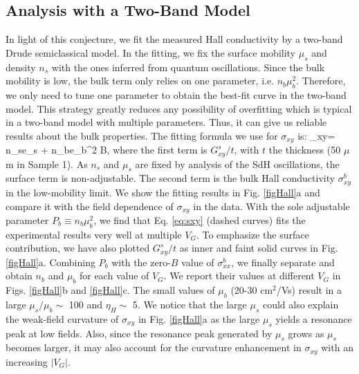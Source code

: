 \subsection{Analysis with a Two-Band Model}

In light of this conjecture, we fit the measured Hall conductivity by a two-band Drude semiclassical model. In the fitting, we fix the surface mobility $\mu_s$ and density $n_s$ with the ones inferred from quantum oscillations. Since the bulk mobility is low, the bulk term only relies on one parameter, i.e.  $n_b\mu_b^2$. Therefore, we only need to tune one parameter to obtain the best-fit curve in the two-band model. This strategy greatly reduces any possibility of overfitting which is typical in a two-band model with multiple parameters. Thus, it can give us reliable results about the bulk properties. The fitting formula we use for $\sigma_{xy}$ is:
\be
\sigma_{xy}= n_se\mu_s + n_be\mu_b^2 B,
\label{eq:sxy}
\ee
where the first term is $G^s_{xy}/t$, with $t$ the thickness (50 $\mu$m in Sample 1). 
As $n_s$ and $\mu_s$ are fixed by analysis of the SdH oscillations, the surface term is 
non-adjustable. The second term is the bulk Hall conductivity
$\sigma^b_{xy}$ in the low-mobility limit. We show the fitting results in Fig. \ref{figHall}a and compare it with the field dependence of $\sigma_{xy}$ in the data.
With the sole adjustable parameter $P_b\equiv n_b\mu_b^2$, we find that Eq. \ref{eq:sxy} 
(dashed curves) fits the experimental results very well at multiple $V_G$.
To emphasize the surface contribution, we have also plotted $G^s_{xy}/t$ as inner and faint solid curves in Fig. \ref{figHall}a. 
Combining $P_b$ with the zero-$B$ value of
$\sigma^b_{xx}$, we finally separate and obtain $n_b$ and $\mu_b$ for each value of $V_G$.
We report their values at different $V_G$ in Figs. \ref{figHall}b and \ref{figHall}c. 
The small values of $\mu_b$ (20-30 cm$^2$/Vs) result in a 
large $\mu_s/\mu_b\sim$ 100 and $\eta_H\sim$ 5. We notice that the large $\mu_s$ could also explain the weak-field curvature of $\sigma_{xy}$ in Fig. \ref{figHall}a as the large $\mu_s$ yields a resonance peak at low fields. Also, since the resonance peak generated by $\mu_s$ grows as $\mu_s$ becomes larger, it may also account for the curvature enhancement in $\sigma_{xy}$ with an increasing $|V_G|$.

